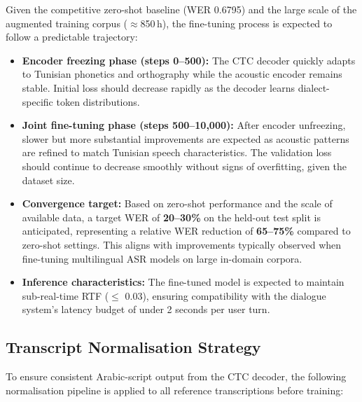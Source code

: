 \documentclass[12pt,a4paper]{report}
\begin{document}
Given the competitive zero-shot baseline (WER 0.6795) and the large scale of the
augmented training corpus ($\approx$850\,h), the fine-tuning process is expected to
follow a predictable trajectory:

\begin{itemize}
    \item \textbf{Encoder freezing phase (steps 0--500):} The CTC decoder quickly adapts
    to Tunisian phonetics and orthography while the acoustic encoder remains stable.
    Initial loss should decrease rapidly as the decoder learns dialect-specific token
    distributions.

    \item \textbf{Joint fine-tuning phase (steps 500--10,000):} After encoder unfreezing,
    slower but more substantial improvements are expected as acoustic patterns are refined
    to match Tunisian speech characteristics. The validation loss should continue to
    decrease smoothly without signs of overfitting, given the dataset size.

    \item \textbf{Convergence target:} Based on zero-shot performance and the scale of
    available data, a target WER of \textbf{20--30\%} on the held-out test split is
    anticipated, representing a relative WER reduction of \textbf{65--75\%} compared to
    zero-shot settings. This aligns with improvements typically observed when fine-tuning
    multilingual ASR models on large in-domain corpora.

    \item \textbf{Inference characteristics:} The fine-tuned model is expected to maintain
    sub-real-time RTF ($\leq$ 0.03), ensuring compatibility with the dialogue system's
    latency budget of under 2 seconds per user turn.
\end{itemize}

\subsection{Transcript Normalisation Strategy}

To ensure consistent Arabic-script output from the CTC decoder, the following normalisation
pipeline is applied to all reference transcriptions before training:
\end{document}
